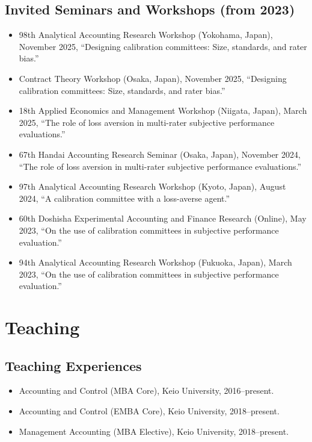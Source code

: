 \documentclass[letterpaper,11pt]{article}
\begin{document}
\subsection*{Invited Seminars and Workshops (from 2023)}

\begin{itemize}
    \item 98th Analytical Accounting Research Workshop (Yokohama, Japan), November 2025, ``Designing calibration committees: Size, standards, and rater bias.''
    \item Contract Theory Workshop (Osaka, Japan), November 2025, ``Designing calibration committees: Size, standards, and rater bias.''
    \item 18th Applied Economics and Management Workshop (Niigata, Japan), March 2025, ``The role of loss aversion in multi-rater subjective performance evaluations.''
    \item 67th Handai Accounting Research Seminar (Osaka, Japan), November 2024, ``The role of loss aversion in multi-rater subjective performance evaluations.''
    \item 97th Analytical Accounting Research Workshop (Kyoto, Japan), August 2024, ``A calibration committee with a loss-averse agent.''
    \item 60th Doshisha Experimental Accounting and Finance Research (Online), May 2023, ``On the use of calibration committees in subjective performance evaluation.''
    \item 94th Analytical Accounting Research Workshop (Fukuoka, Japan), March 2023, ``On the use of calibration committees in subjective performance evaluation.''
\end{itemize}

\section*{Teaching}

\subsection*{Teaching Experiences}

\begin{itemize}
	\item Accounting and Control (MBA Core), Keio University, 2016--present.
	\item Accounting and Control (EMBA Core), Keio University, 2018--present.
	\item Management Accounting (MBA Elective), Keio University, 2018--present.
\end{itemize}
\end{document}
